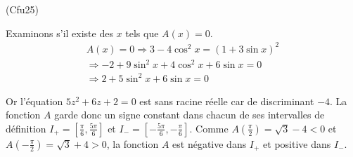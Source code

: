 \begin{tiny}(Cfu25)\end{tiny} Examinons s'il existe des $x$ tels que $A(x)=0$.
\begin{multline*}
A(x)=0 \Rightarrow 3-4\cos^2 x = (1+3\sin x)^2\\
\Rightarrow -2+9\sin^2 x + 4\cos^2x+6\sin  x = 0\\
\Rightarrow 2+5\sin^2x + 6\sin x =0
\end{multline*}

Or l'équation $5z^2 +6z +2=0$ est sans racine réelle car de discriminant $-4$.\newline
La fonction $A$ garde donc un signe constant dans chacun de ses intervalles de définition $I_+=[\frac{\pi}{6},\frac{5\pi}{6}]$ et 
$I_-=[-\frac{5\pi}{6}, -\frac{\pi}{6}]$.\newline
Comme $A(\frac{\pi}{2})=\sqrt{3} -4<0$ et $A(-\frac{\pi}{2})=\sqrt{3} +4>0$, la fonction $A$ est négative dans $I_+$ et positive dans $I_-$.
